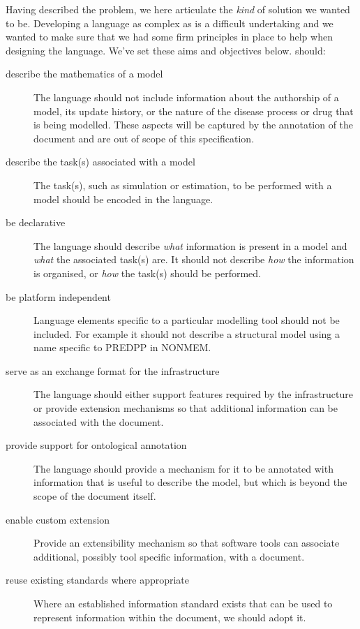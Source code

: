Having described the problem, we here articulate the \emph{kind} of solution we wanted \pharmml to be.
Developing a language as complex as \pharmml is a difficult undertaking and we wanted to make sure
that we had some firm principles in place to help when designing the language. We've set these aims
and objectives below. \pharmml should:

\begin{description}
\item[describe the mathematics of a model] The language should not include information about the authorship of a model, its update history, or the nature of the disease process or drug that is being modelled. These aspects will be captured by the annotation of the \pharmml document and are out of scope of this specification.
\item[describe the task(s) associated with a model] The task(s), such as simulation or estimation, to be performed with a model should be encoded in the language.
\item[be declarative] The language should describe \emph{what} information is present in a model and \emph{what} the associated task(s) are. It should not describe \emph{how} the information is organised, or \emph{how} the task(s) should be performed.
\item[be platform independent] Language elements specific to a particular modelling tool should not be included. For example it should not describe a structural model using a name specific to PREDPP in NONMEM.
\item[serve as an exchange format for the \ddmore infrastructure] The language should either support features required by the infrastructure or provide extension mechanisms so that additional information can be associated with the \pharmml document.
\item[provide support for ontological annotation] The language should provide a mechanism for it to be annotated with information that is useful to describe the model, but which is beyond the scope of the \pharmml document itself.
\item[enable custom extension] Provide an extensibility mechanism so that software tools can associate additional, possibly tool specific information, with a \pharmml document.
\item[reuse existing standards where appropriate] Where an established information standard exists that can be used to represent information within the \pharmml document, we should adopt it.
\end{description}

